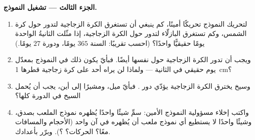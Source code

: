 \begin{problem}
\medskip\noindent\textbf{الجزء الثالث --- تشغيل النموذج.}
\begin{enumerate}[resume]
  \item لتحريك النموذج تحريكًا أمينًا، كم ينبغي أن تستغرق الكرة
        الزجاجية لتدور حول كرة الشمس، وكم تستغرق البازلّاء لتدور
        حول الكرة الزجاجية، إذا مثّلت الثانيةُ الواحدة يومًا
        حقيقيًّا واحدًا؟ (احسب تقريبًا: السنة $365$ يومًا،
        ودورة  $27$ يومًا.)
  \item ويجب أن تدور الكرة الزجاجية حول نفسها أيضًا. فبأيّ 
        يكون ذلك في النموذج بمعدّل يوم حقيقي في الثانية ---
        ولماذا لن يراه أحد على كرة زجاجية قطرها \qty{1}{cm}؟
  \item وسيخ يخترق الكرة الزجاجية يؤدّي دور . فبأيّ ميل،
        ومشيرًا إلى أين، يجب أن يُحمل السيخ في الدورة كلها؟
  \item واكتب إخلاء مسؤولية النموذج الأمين: سمِّ شيئًا واحدًا
        يُظهره نموذج الملعب بصدق، وشيئًا واحدًا لا يستطيع أي
        نموذج  ملعب أن يُظهره في آن واحد (الأحجام والمسافات
        معًا؟ الحركات؟ ؟). وبرّر بأعدادك.
\end{enumerate}
\end{problem}

